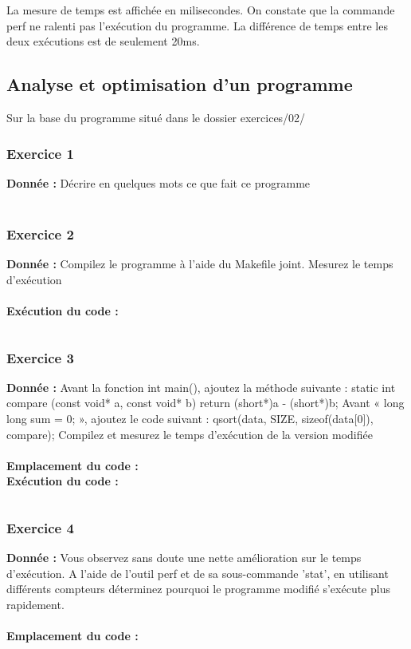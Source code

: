 La mesure de temps est affichée en milisecondes. On constate que la commande perf ne ralenti pas l'exécution du programme. La différence de temps entre les deux exécutions est de seulement 20ms.

\subsection{Analyse et optimisation d'un programme}
Sur	la	base	du	programme	situé	dans	le	dossier	exercices/02/
\subsubsection{Exercice 1}
\textbf{Donnée : } Décrire	en	quelques	mots	ce	que	fait	ce	programme\\\\

\subsubsection{Exercice 2}
\textbf{Donnée : } Compilez	le	programme	à	l'aide	du	Makefile	joint.
Mesurez	le	temps	d'exécution\\\\

\textbf{Exécution du code : } \\
\begin{lstlisting}

\end{lstlisting}

\subsubsection{Exercice 3}
\textbf{Donnée : } Avant	la	fonction	int	main(),	ajoutez	la	méthode	suivante :
static int compare (const void* a, const void* b)
{return (short*)a - (short*)b;}
Avant	« long	long	sum	=	0; »,	ajoutez	le	code	suivant :
qsort(data, SIZE, sizeof(data[0]), compare);
Compilez	et	mesurez	le	temps	d'exécution	de	la	version	modifiée\\\\
\textbf{Emplacement du code : } \textit{}\\

\textbf{Exécution du code : } \\
\begin{lstlisting}

\end{lstlisting}

\subsubsection{Exercice 4}
\textbf{Donnée : } Vous	observez	sans	doute	une	nette	amélioration	sur	le	temps	d'exécution.
A	l'aide	de	l'outil	perf	et	de	sa	sous-commande	'stat',	en	utilisant	différents	compteurs	déterminez	
pourquoi	le	programme	modifié	s'exécute	plus	rapidement.\\\\
\textbf{Emplacement du code : } \textit{}\\

